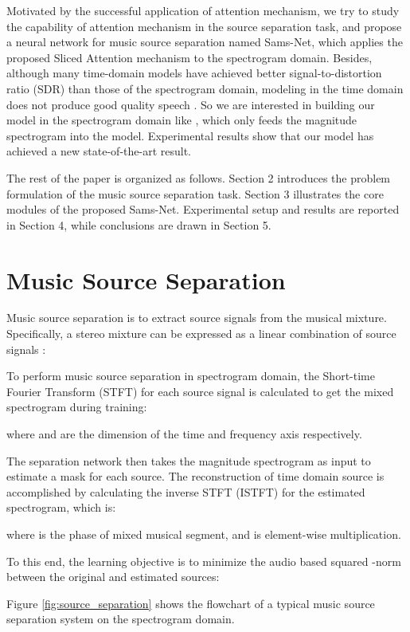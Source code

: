 \documentclass[a4paper]{article}
\begin{document}
Motivated by the successful application of attention mechanism, we try to study the capability of attention mechanism in the source separation task, and propose a neural network for music source separation named Sams-Net, which applies the proposed Sliced Attention mechanism to the spectrogram domain. Besides, although many time-domain models have achieved better signal-to-distortion ratio (SDR) \cite{vincent2006performance} than those of the spectrogram domain, modeling in the time domain does not produce good quality speech \cite{pandey2018new}. So we are interested in building our model in the spectrogram domain like \cite{stoter2019open}, which only feeds the magnitude spectrogram into the model. Experimental results show that our model has achieved a new state-of-the-art result.

The rest of the paper is organized as follows. Section 2 introduces the problem formulation of the music source separation task. Section 3 illustrates the core modules of the proposed Sams-Net. Experimental setup and results are reported in Section 4, while conclusions are drawn in Section 5.


\section{Music Source Separation}
Music source separation is to extract source signals from the musical mixture. Specifically, a stereo mixture  can be expressed as a linear combination of  source signals :


To perform music source separation in spectrogram domain, the Short-time Fourier Transform (STFT)  for each source signal  is calculated to get the mixed spectrogram  during training:

where  and  are the dimension of the time and frequency axis respectively.

The separation network then takes the magnitude spectrogram  as input to estimate a mask  for each source. The reconstruction of time domain source  is accomplished by calculating the inverse STFT (ISTFT) for the estimated spectrogram, which is:

where  is the phase of mixed musical segment, and  is element-wise multiplication.

To this end, the learning objective is to minimize the audio based squared -norm \cite{stoller2018wave} between the original and estimated sources:


Figure \ref{fig:source_separation} shows the flowchart of a typical music source separation system on the spectrogram domain.
\end{document}
